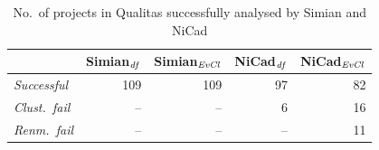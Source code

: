 \documentclass{sig-alternate-05-2015}
\begin{document}
\begin{table}
	\centering
	\caption{No.~of projects in Qualitas successfully analysed by Simian and NiCad}
	\label{tab:projects_missing}
	\small
	\begin{tabular}{l|r|r|r|r}
		\hline
		& Simian$_{\textrm{\textit{df}}}$ & Simian$_{\textrm{\textit{EvCl}}}$  & NiCad$_{\textrm{\textit{df}}}$ & NiCad$_{\textrm{\textit{EvCl}}}$ \\ 
		\hline
		\textit{Successful} & 109 & 109 & 97 & 82 \\ 
		\textit{Clust.~fail} & -- & -- & 6 & 16 \\
		\textit{Renm.~fail} & -- &  -- & -- & 11 \\
		\hline
	\end{tabular}
\end{table}



\end{document}
